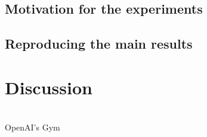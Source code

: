 \documentclass{article}
\begin{document}
\subsection{Motivation for the experiments}
\subsection{Reproducing the main results}



\section{Discussion}


\citet{mnih2015} \\
OpenAI's Gym \citep{gym} \\
\citep{pytorch} \\
\citet{amiranashvili2018analyzing} \\
\citet{pmlr-v48-mniha16}

\pagebreak

\small


\end{document}
